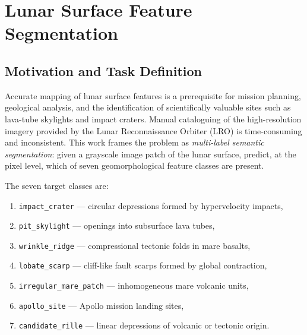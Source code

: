 %
%

\section{Lunar Surface Feature Segmentation}
\label{sec:moon_recognition}

\subsection{Motivation and Task Definition}
\label{sec:mr_motivation}

Accurate mapping of lunar surface features is a prerequisite for mission planning, geological analysis, and the identification of scientifically valuable sites such as lava-tube skylights and impact craters. Manual cataloguing of the high-resolution imagery provided by the Lunar Reconnaissance Orbiter (LRO) is time-consuming and inconsistent. This work frames the problem as \textit{multi-label semantic segmentation}: given a grayscale image patch of the lunar surface, predict, at the pixel level, which of seven geomorphological feature classes are present.

The seven target classes are:
\begin{enumerate}
    \item \texttt{impact\_crater} — circular depressions formed by hypervelocity impacts,
    \item \texttt{pit\_skylight} — openings into subsurface lava tubes,
    \item \texttt{wrinkle\_ridge} — compressional tectonic folds in mare basalts,
    \item \texttt{lobate\_scarp} — cliff-like fault scarps formed by global contraction,
    \item \texttt{irregular\_mare\_patch} — inhomogeneous mare volcanic units,
    \item \texttt{apollo\_site} — Apollo mission landing sites,
    \item \texttt{candidate\_rille} — linear depressions of volcanic or tectonic origin.
\end{enumerate}

